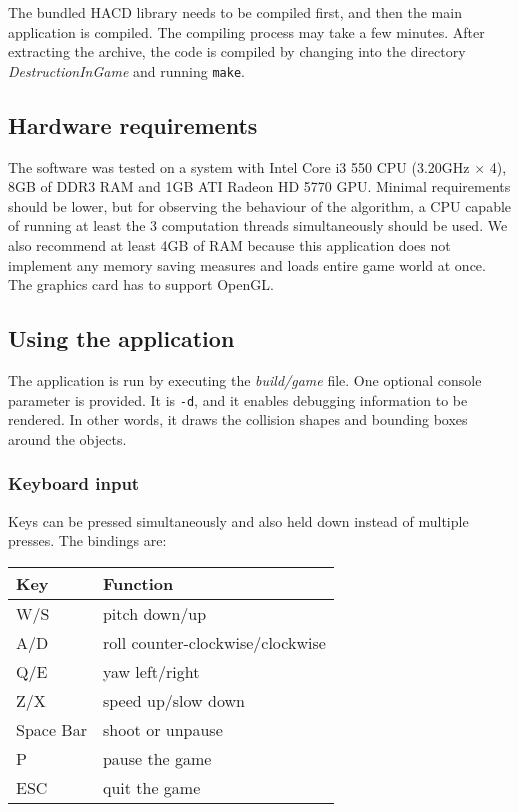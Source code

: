 The bundled HACD library needs to be compiled first, and then the main application is compiled. The compiling process may take a few minutes. After extracting the archive, the code is compiled by changing into the directory \emph{DestructionInGame} and running \texttt{make}.

\subsection*{Hardware requirements}
The software was tested on a system with Intel Core i3 550 CPU (3.20GHz $\times$ 4), 8GB of DDR3 RAM and 1GB ATI Radeon HD 5770 GPU. Minimal requirements should be lower, but for observing the behaviour of the algorithm, a CPU capable of running at least the 3 computation threads simultaneously should be used. We also recommend at least 4GB of RAM because this application does not implement any memory saving measures and loads entire game world at once. The graphics card has to support OpenGL.

\subsection*{Using the application}
The application is run by executing the \emph{build/game} file. One optional console parameter is provided. It is {\tt -d}, and it enables debugging information to be rendered. In other words, it draws the collision shapes and bounding boxes around the objects.
\subsubsection*{Keyboard input}
Keys can be pressed simultaneously and also held down instead of multiple presses. The bindings are:

\begin{centering}
  \begin{tabular}{ll}
  Key & Function \\
  \hline
  W/S & pitch down/up \\
  A/D & roll counter-clockwise/clockwise \\
  Q/E & yaw left/right \\
  Z/X & speed up/slow down \\
  Space Bar & shoot or unpause \\ 
  P & pause the game \\
  ESC & quit the game \\
  \end{tabular}
\end{centering}

